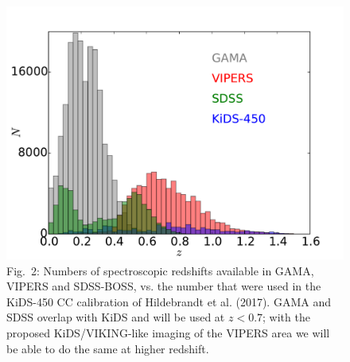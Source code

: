 \documentclass{article}[11pt]
\begin{document}
\begin{figure}
 \begin{minipage}[c]{0.55\textwidth}
  \includegraphics[width=\textwidth]{ESO_prop_plot_zdist.pdf}
  \end{minipage}\hfill
  \begin{minipage}[c]{0.40\textwidth}
    \caption*{Fig.~2: Numbers of spectroscopic redshifts available in GAMA, VIPERS and SDSS-BOSS, vs. the number that were used in the KiDS-450 CC calibration of Hildebrandt et al. (2017). GAMA and SDSS overlap with KiDS and will be used at $z<0.7$; with the proposed KiDS/VIKING-like imaging of the VIPERS area we will be able to do the same at higher redshift.}
  \end{minipage}
\end{figure}
\end{document}
